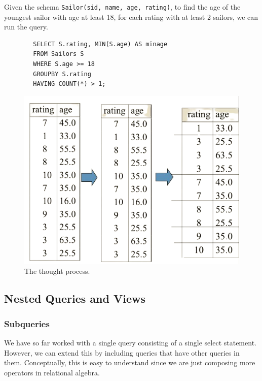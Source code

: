     \begin{example}
      Given the schema \texttt{Sailor(sid, name, age, rating)}, to find the age of the youngest sailor with age at least 18, for each rating with at least 2 sailors, we can run the query. 
      \begin{lstlisting}
        SELECT S.rating, MIN(S.age) AS minage 
        FROM Sailors S 
        WHERE S.age >= 18
        GROUPBY S.rating 
        HAVING COUNT(*) > 1; 
      \end{lstlisting}

      \begin{figure}[H]
        \centering 
        \includegraphics[scale=0.4]{img/sailors.png}
        \caption{The thought process.} 
        \label{fig:thought}
      \end{figure}
    \end{example}

\subsection{Nested Queries and Views} 

  \subsubsection{Subqueries}

    We have so far worked with a single query consisting of a single select statement. However, we can extend this by including queries that have other queries in them. Conceptually, this is easy to understand since we are just composing more operators in relational algebra. 

